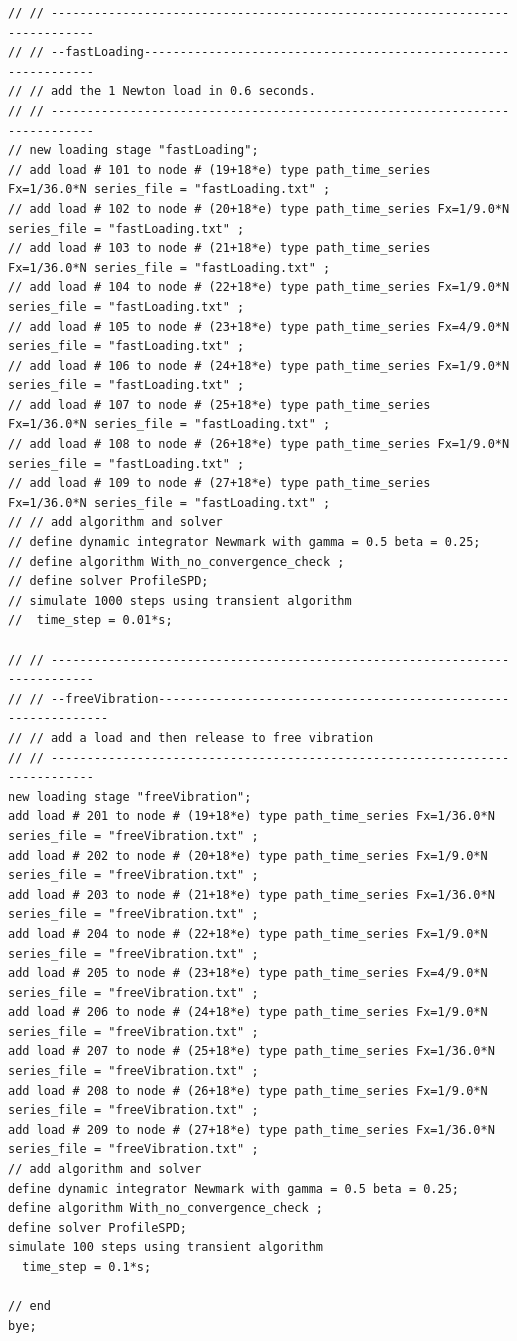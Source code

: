 \begin{lstlisting}
// // ----------------------------------------------------------------------------
// // --fastLoading---------------------------------------------------------------
// // add the 1 Newton load in 0.6 seconds.
// // ----------------------------------------------------------------------------
// new loading stage "fastLoading";
// add load # 101 to node # (19+18*e) type path_time_series Fx=1/36.0*N series_file = "fastLoading.txt" ; 
// add load # 102 to node # (20+18*e) type path_time_series Fx=1/9.0*N series_file = "fastLoading.txt" ; 
// add load # 103 to node # (21+18*e) type path_time_series Fx=1/36.0*N series_file = "fastLoading.txt" ; 
// add load # 104 to node # (22+18*e) type path_time_series Fx=1/9.0*N series_file = "fastLoading.txt" ; 
// add load # 105 to node # (23+18*e) type path_time_series Fx=4/9.0*N series_file = "fastLoading.txt" ; 
// add load # 106 to node # (24+18*e) type path_time_series Fx=1/9.0*N series_file = "fastLoading.txt" ; 
// add load # 107 to node # (25+18*e) type path_time_series Fx=1/36.0*N series_file = "fastLoading.txt" ; 
// add load # 108 to node # (26+18*e) type path_time_series Fx=1/9.0*N series_file = "fastLoading.txt" ; 
// add load # 109 to node # (27+18*e) type path_time_series Fx=1/36.0*N series_file = "fastLoading.txt" ; 
// // add algorithm and solver
// define dynamic integrator Newmark with gamma = 0.5 beta = 0.25;
// define algorithm With_no_convergence_check ;
// define solver ProfileSPD;
// simulate 1000 steps using transient algorithm 
//  time_step = 0.01*s;

// // ----------------------------------------------------------------------------
// // --freeVibration---------------------------------------------------------------
// // add a load and then release to free vibration
// // ----------------------------------------------------------------------------
new loading stage "freeVibration";
add load # 201 to node # (19+18*e) type path_time_series Fx=1/36.0*N series_file = "freeVibration.txt" ; 
add load # 202 to node # (20+18*e) type path_time_series Fx=1/9.0*N series_file = "freeVibration.txt" ; 
add load # 203 to node # (21+18*e) type path_time_series Fx=1/36.0*N series_file = "freeVibration.txt" ; 
add load # 204 to node # (22+18*e) type path_time_series Fx=1/9.0*N series_file = "freeVibration.txt" ; 
add load # 205 to node # (23+18*e) type path_time_series Fx=4/9.0*N series_file = "freeVibration.txt" ; 
add load # 206 to node # (24+18*e) type path_time_series Fx=1/9.0*N series_file = "freeVibration.txt" ; 
add load # 207 to node # (25+18*e) type path_time_series Fx=1/36.0*N series_file = "freeVibration.txt" ; 
add load # 208 to node # (26+18*e) type path_time_series Fx=1/9.0*N series_file = "freeVibration.txt" ; 
add load # 209 to node # (27+18*e) type path_time_series Fx=1/36.0*N series_file = "freeVibration.txt" ; 
// add algorithm and solver
define dynamic integrator Newmark with gamma = 0.5 beta = 0.25;
define algorithm With_no_convergence_check ;
define solver ProfileSPD;
simulate 100 steps using transient algorithm 
  time_step = 0.1*s;

// end
bye;
\end{lstlisting}

